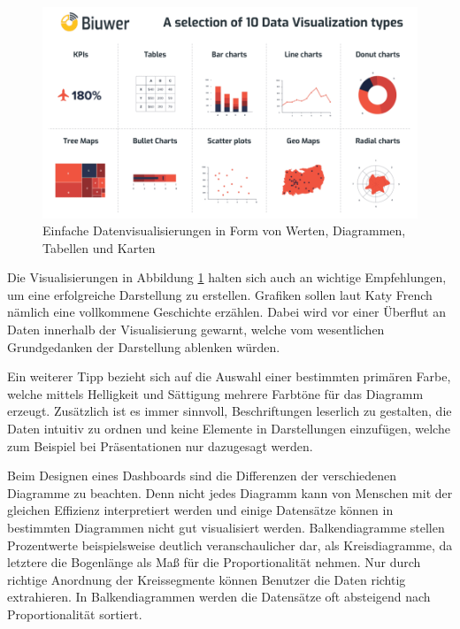 \begin{figure}
    \centering
    \includegraphics[width=1\textwidth]{content/img/Research/Visualisation/simple_visualisation_methods.png}
    \caption{Einfache Datenvisualisierungen in Form von Werten, Diagrammen, Tabellen und Karten \cite{morales2020picture}}
    \label{fig:einfacheDatenvisualisierung}
\end{figure}
\FloatBarrier


Die Visualisierungen in Abbildung \ref{fig:einfacheDatenvisualisierung} halten sich auch an wichtige Empfehlungen, um eine erfolgreiche Darstellung zu erstellen. Grafiken sollen laut Katy French nämlich eine vollkommene Geschichte erzählen. Dabei wird vor einer Überflut an Daten innerhalb der Visualisierung gewarnt, welche vom wesentlichen Grundgedanken der Darstellung ablenken würden. \cite{frenchsimplevis}

Ein weiterer Tipp bezieht sich auf die Auswahl einer bestimmten primären Farbe, welche mittels Helligkeit und Sättigung mehrere Farbtöne für das Diagramm erzeugt. Zusätzlich ist es immer sinnvoll, Beschriftungen leserlich zu gestalten, die Daten intuitiv zu ordnen und keine Elemente in Darstellungen einzufügen, welche zum Beispiel bei Präsentationen nur dazugesagt werden. \cite{frenchsimplevis}

Beim Designen eines Dashboards sind die Differenzen der verschiedenen Diagramme zu beachten. Denn nicht jedes Diagramm kann von Menschen mit der gleichen Effizienz interpretiert werden und einige Datensätze können in bestimmten Diagrammen nicht gut visualisiert werden. Balkendiagramme stellen Prozentwerte beispielsweise deutlich veranschaulicher dar, als Kreisdiagramme, da letztere die Bogenlänge als Maß für die Proportionalität nehmen. Nur durch richtige Anordnung der Kreissegmente können Benutzer die Daten richtig extrahieren. In Balkendiagrammen werden die Datensätze oft absteigend nach Proportionalität sortiert. \cite{2023diagrammarten}

